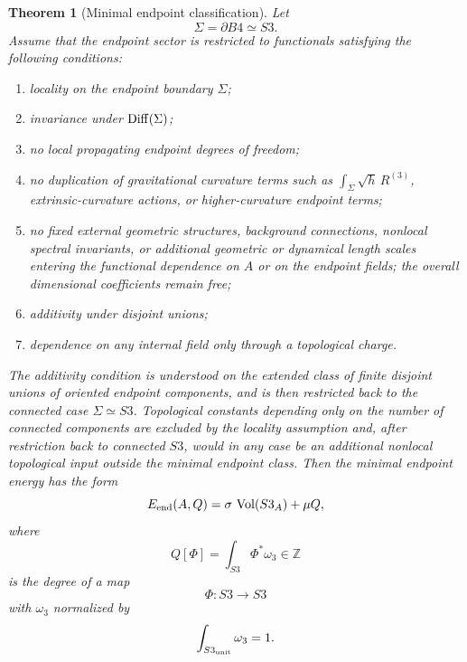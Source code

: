 \documentclass[11pt,a4paper]{article}
\def\Bfour{B4}%
\def\Sthree{S3}%
\numberwithin{equation}{section}
\newtheorem{theorem}[criterion]{Theorem}
\theoremstyle{remark}
\newcommand{\Sthree}{S^3}
\newcommand{\Bfour}{B^4}
\begin{document}
\begin{theorem}[Minimal endpoint classification]
Let
\begin{equation}
\Sigma=\partial\Bfour\simeq \Sthree .
\end{equation}
Assume that the endpoint sector is restricted to functionals satisfying the following conditions:
\begin{enumerate}
\item locality on the endpoint boundary \(\Sigma\);
\item invariance under \({\rm Diff}(\Sigma)\);
\item no local propagating endpoint degrees of freedom;
\item no duplication of gravitational curvature terms such as
\(\int_\Sigma \sqrt h\,R^{(3)}\), extrinsic-curvature actions, or higher-curvature endpoint terms;
\item no fixed external geometric structures, background connections, nonlocal spectral invariants, or additional geometric or dynamical length scales entering the functional dependence on \(A\) or on the endpoint fields; the overall dimensional coefficients remain free;
\item additivity under disjoint unions;
\item dependence on any internal field only through a topological charge.
\end{enumerate}
The additivity condition is understood on the extended class of finite disjoint unions of oriented endpoint components, and is then restricted back to the connected case \(\Sigma\simeq\Sthree\). Topological constants depending only on the number of connected components are excluded by the locality assumption and, after restriction back to connected \(\Sthree\), would in any case be an additional nonlocal topological input outside the minimal endpoint class.
Then the minimal endpoint energy has the form
\begin{equation}
E_{\rm end}(A,Q)
=\sigma\,\operatorname{Vol}(\Sthree_A)+\mu Q,
\end{equation}
where
\begin{equation}
Q[\Phi]=\int_{\Sthree}\Phi^*\omega_3\in\mathbb{Z}
\end{equation}
is the degree of a map
\begin{equation}
\Phi:\Sthree\longrightarrow \Sthree
\end{equation}
with \(\omega_3\) normalized by
\begin{equation}
\int_{\Sthree_{\rm unit}}\omega_3=1 .
\end{equation}

\end{theorem}
\end{document}
